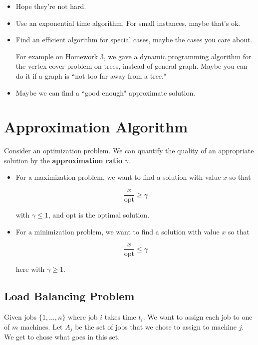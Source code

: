 \documentclass[12pt]{article}
\def\opt{\text{opt}}
\begin{document}
  \begin{itemize}
    \item Hope they're not hard.
    \item Use an exponential time algorithm. For small instances, maybe that's
      ok.
    \item Find an efficient algorithm for special cases, maybe the cases you
      care about.

      For example on Homework 3, we gave a dynamic programming algorithm for the
      vertex cover problem on trees, instead of general graph. Maybe you can do
      it if a graph is ``not too far away from a tree."

    \item Maybe we can find a ``good enough" approximate solution.
  \end{itemize}

  \section{Approximation Algorithm}

  Consider an optimization problem. We can quantify the quality of an
  appropriate solution by the {\bf approximation ratio} $\gamma$.

  \begin{itemize}
    \item For a maximization problem, we want to find a solution with value $x$
      so that

      \[
        \frac{x}{\opt} \ge \gamma
      \]

      with $\gamma \le 1$, and $\opt$ is the optimal solution.

    \item For a minimization problem, we want to find a solution with value $x$
      so that

      \[
        \frac{x}{\opt} \le \gamma
      \]

      here with $\gamma \ge 1$.
  \end{itemize}

  \subsection{Load Balancing Problem}

  Given jobs $\{1, \dots, n\}$ where job $i$ takes time $t_i$. We want to assign
  each job to one of $m$ machines. Let $A_j$ be the set of jobs that we chose to
  assign to machine $j$. We get to chose what goes in this set.
\end{document}
